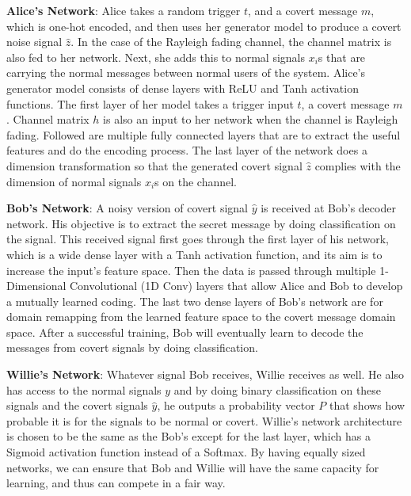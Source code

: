 \textbf{Alice's Network}: Alice takes a random trigger \(t\), and a covert message \(m\), which is one-hot encoded, and then uses her generator model to produce a covert noise signal \(\hat{z}\). In the case of the Rayleigh fading channel, the channel matrix is also fed to her network. Next, she adds this to normal signals \(x_i\)s that are carrying the normal messages between normal users of the system. Alice's generator model consists of dense layers with ReLU and Tanh activation functions. The first layer of her model takes a trigger input \(t\), a covert message \(m\). Channel matrix \(h\) is also an input to her network when the channel is Rayleigh fading. Followed are multiple fully connected layers that are to extract the useful features and do the encoding process. The last layer of the network does a dimension transformation so that the generated covert signal \(\hat{z}\) complies with the dimension of normal signals \(x_i\)s on the channel. 

\textbf{Bob's Network}: A noisy version of covert signal \(\hat{y}\) is received at Bob's decoder network. His objective is to extract the secret message by doing classification on the signal. This received signal first goes through the first layer of his network, which is a wide dense layer with a Tanh activation function, and its aim is to increase the input's feature space. Then the data is passed through multiple 1-Dimensional Convolutional (1D Conv) layers that allow Alice and Bob to develop a mutually learned coding. The last two dense layers of Bob's network are for domain remapping from the learned feature space to the covert message domain space. After a successful training, Bob will eventually learn to decode the messages from covert signals by doing classification.


\textbf{Willie's Network}: Whatever signal Bob receives, Willie receives as well. He also has access to the normal signals \(y\) and by doing binary classification on these signals and the covert signals \(\hat{y}\), he outputs a probability vector \(P\) that shows how probable it is for the signals to be normal or covert. Willie's network architecture is chosen to be the same as the Bob's except for the last layer, which has a Sigmoid activation function instead of a Softmax. By having equally sized networks, we can ensure that Bob and Willie will have the same capacity for learning, and thus can compete in a fair way.


